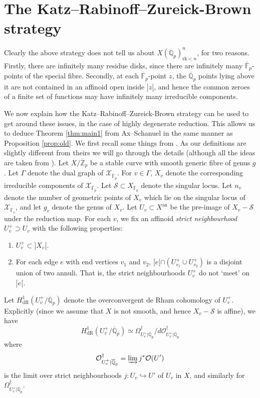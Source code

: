 \documentclass{amsart}
\def\Z{\mathbb Z}
\def\Q{\mathbb Q}
\newcommand{\dR}{\mathrm{dR}}
\newcommand{\rk}{\mathrm{rk}}
\newcommand{\an}{\mathrm{an}}
\theoremstyle{plain}
\theoremstyle{definition}
\newcommand{\F}{\mathbb{F}}
\begin{document}
\section{The Katz--Rabinoff--Zureick-Brown strategy}
Clearly the above strategy does not tell us about $X(\overline{\Q }_p )^n _{\rk <n}$, for two reasons. Firstly, there are infinitely many residue disks, since there are infinitely many $\overline{\F }_p $-points of the special fibre. Secondly, at each $\overline{\F }_p $-point $z$, the $\overline{\Q }_p $ points lying above it are not contained in an affinoid open inside $]z[$, and hence the common zeroes of a finite set of functions may have infinitely many irreducible components.

We now explain how the Katz--Rabinoff--Zureick-Brown strategy can be used to get around these issues, in the case of highly degenerate reduction. This allows us to deduce Theorem \ref{thm:main1} from Ax--Schanuel in the same manner as Proposition \ref{prop:old}. We first recall some things from \cite{KRB}. As our definitions are slightly different from theirs we will go through the details (although all the ideas are taken from \cite{KRB}). Let $X/\overline{\Z }_p$ be a stable curve with smooth generic fibre of genus $g$. Let $\Gamma $ denote the dual graph of $\mathcal{X}_{\overline{\F }_p }$. For $v\in \Gamma $, $X_v $ denote the corresponding irreducible components of $\mathcal{X}_{\overline{\F }_p }$. Let $\mathcal{S}\subset X_{\overline{\F }_p }$ denote the singular locus. Let $n_v $ denote the number of geometric points of $X_v $ which lie on the singular locus of $\mathcal{X}_{\overline{\F }_v }$, and let $g_v $ denote the genus of $X_v $. Let $U_v \subset X^{\an }$ be the pre-image of $X_v -\mathcal{S}$ under the reduction map. For each $v$, we fix an affinoid \textit{strict neighbourhood} $U_v ^+ \supset U_v $ with the following properties:
\begin{enumerate}
\item $U_v ^+ \subset ]X_v [$.
\item For each edge $e$ with end vertices $v_1 $ and $v_2 $, $]e[ \cap (U_{v_1 }^+ \cup U_{v_2 }^+ )$ is a disjoint union of two annuli. That is, the strict neighbourhoods $U_v ^+$ do not `meet' on $]e[$.
\end{enumerate}
Let $H^1 _{\dR}(U_v ^+ /\overline{\Q }_p)$ denote the overconvergent de Rham cohomology of $U_v ^+ $. Explicitly (since we assume that $X$ is not smooth, and hence $X_v -\mathcal{S}$ is affine), we have
\[
H^1 _{\dR}(U_v ^+ /\overline{\Q }_p)\simeq \Omega ^\dagger _{U_v ^+  |\overline{\Q }_p}/d\mathcal{O}^\dagger _{U_v ^+ |\overline{\Q }_p}
\]
where 
\[
\mathcal{O}^\dagger _{U_v ^+ |\overline{\Q }_p}=\varinjlim j^* \mathcal{O}(U')
\]
is the limit over strict neighbourhoods $j:U_v \hookrightarrow U'$ of $U_v $ in $X$, and similarly for $\Omega ^\dagger _{U_v ^+ |\overline{\Q }_p}$.
\end{document}
